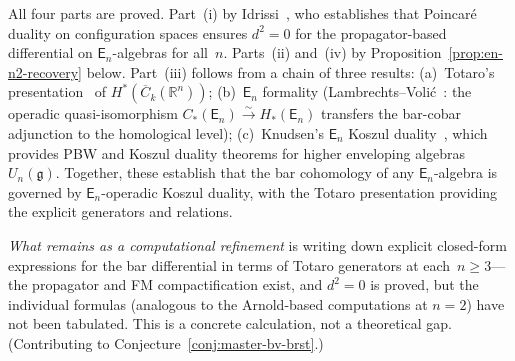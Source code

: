 \begin{remark}\label{rem:en-scope}
All four parts are proved.  Part~(i) by
Idrissi~\cite{Idrissi22}, who establishes that Poincar\'e duality on
configuration spaces ensures $d^2 = 0$ for the propagator-based
differential on $\mathsf{E}_n$-algebras for all~$n$.  Parts~(ii)
and~(iv) by Proposition~\ref{prop:en-n2-recovery} below.  Part~(iii)
follows from a chain of three results: (a)~Totaro's
presentation~\cite{Totaro96} of
$H^*(\overline{C}_k(\mathbb{R}^n))$; (b)~$\mathsf{E}_n$ formality
(Lambrechts--Voli\'c~\cite{LambrechtsVolic14}: the operadic
quasi-isomorphism $C_*(\mathsf{E}_n) \xrightarrow{\sim}
H_*(\mathsf{E}_n)$ transfers the bar-cobar adjunction to the
homological level); (c)~Knudsen's $\mathsf{E}_n$ Koszul
duality~\cite{Knudsen18}, which provides PBW and Koszul duality
theorems for higher enveloping algebras $U_n(\mathfrak{g})$.
Together, these establish that the bar cohomology of any
$\mathsf{E}_n$-algebra is governed by $\mathsf{E}_n$-operadic Koszul
duality, with the Totaro presentation providing the explicit
generators and relations.

\emph{What remains as a computational refinement} is writing down
explicit closed-form expressions for the bar differential in terms of
Totaro generators at each~$n \geq 3$---the propagator and FM
compactification exist, and $d^2 = 0$ is proved, but the individual
formulas (analogous to the Arnold-based computations at $n = 2$) have
not been tabulated.  This is a concrete calculation, not a
theoretical gap.
(Contributing to Conjecture~\ref{conj:master-bv-brst}.)
\end{remark}

